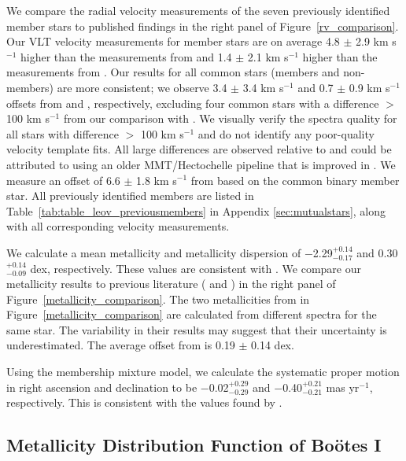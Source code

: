 \documentclass[twocolumn]{aastex63}
\newcommand{\revise}[1]{#1}
\begin{document}
We compare the radial velocity measurements of the seven previously identified member stars to published findings in the right panel of Figure~\ref{rv_comparison}. Our VLT velocity measurements for member stars are on average 4.8 $\pm$ 2.9 km s$^{-1}$ higher than the measurements from \citet{col2017} and 1.4 $\pm$ 2.1 km s$^{-1}$  higher than the measurements from \citet{wal2009}. Our results for all common stars (members and non-members) are more consistent; we observe 3.4 $\pm$ 3.4 km s$^{-1}$ and 0.7 $\pm$ 0.9 km s$^{-1}$ offsets from \citet{col2017} and \citet{wal2009}, respectively, excluding four common stars with a difference $>$ 100 km s$^{-1}$ from our comparison with \citet{wal2009}. We visually verify the spectra quality for all stars with difference $>$ 100 km s$^{-1}$ and do not identify any poor-quality velocity template fits. All large differences are observed relative to \citet{wal2009} and could be attributed to \citet{wal2009} using an older MMT/Hectochelle pipeline that is improved in \citet{mut2020}. We measure an offset of 6.6 $\pm$ 1.8 km s$^{-1}$ from \citet{mut2020} based on the common binary member star. All previously identified members are listed in Table~\ref{tab:table_leov_previousmembers} in Appendix \ref{sec:mutualstars}, along with all corresponding velocity measurements.

We calculate a mean metallicity and metallicity dispersion of \revise{$-$2.29$^{+0.14}_{-0.17}$ and 0.30$^{+0.14}_{-0.09}$ dex}, respectively. These values are consistent with \citet{col2017}. We compare our metallicity results to previous literature (\citet{col2017} and \citet{mut2020}) in the right panel of Figure~\ref{metallicity_comparison}. The two metallicities from \citet{mut2020} in Figure~\ref{metallicity_comparison} are calculated from different spectra for the same star. The variability in their results may suggest that their uncertainty is underestimated. The average offset from \citet{col2017} is 0.19 $\pm$ 0.14 dex.

Using the membership mixture model, we calculate the systematic proper motion in right ascension and declination to be $-$0.02$^{+0.29}_{-0.29}$ and $-$0.40$^{+0.21}_{-0.21}$ mas yr$^{-1}$, respectively. This is consistent with the values found by \citet{mcc2020}.

\subsection{Metallicity Distribution Function of Bo{\"o}tes I}
\end{document}
